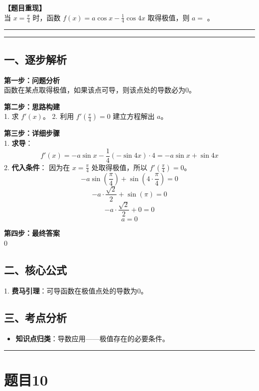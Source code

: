 \documentclass[12pt, a4paper]{ctexart}
\newcommand{\TopSeparator}{
    \par\noindent\rule{\textwidth}{1.5pt}\vspace{0.5em} %
}
\newcommand{\AnalysisSeparator}{
    \par\noindent\rule{\textwidth}{0.5pt}\vspace{0.2em}\hrule\vspace{0.5em} %
}
\newenvironment{RedAnalysis}{
    \par
    \color{red} %
}{
    \par
    \color{black} %
}
\begin{document}
\textbf{【题目重现】} \\
当 $ x=\frac{\pi}{4} $ 时，函数 $ f(x)=a\cos x-\frac{1}{4}\cos 4x $ 取得极值，则 $a=$ \underline{\hspace{2cm}}。

\AnalysisSeparator

\begin{RedAnalysis}

\subsection*{一、逐步解析}

\textbf{第一步：问题分析} \\
函数在某点取得极值，如果该点可导，则该点处的导数必为0。

\textbf{第二步：思路构建} \\
1. 求 $f'(x)$。
2. 利用 $f'(\frac{\pi}{4}) = 0$ 建立方程解出 $a$。

\textbf{第三步：详细步骤} \\
1. \textbf{求导}：
   \[ f'(x) = -a\sin x - \frac{1}{4}(-\sin 4x) \cdot 4 = -a\sin x + \sin 4x \]
2. \textbf{代入条件}：
   因为在 $x = \frac{\pi}{4}$ 处取得极值，所以 $f'(\frac{\pi}{4}) = 0$。
   \[ -a\sin(\frac{\pi}{4}) + \sin(4 \cdot \frac{\pi}{4}) = 0 \]
   \[ -a \cdot \frac{\sqrt{2}}{2} + \sin(\pi) = 0 \]
   \[ -a \cdot \frac{\sqrt{2}}{2} + 0 = 0 \]
   \[ a = 0 \]

\textbf{第四步：最终答案} \\
0

\subsection*{二、核心公式}
1. \textbf{费马引理}：可导函数在极值点处的导数为0。

\subsection*{三、考点分析}
\begin{itemize}
    \item \textbf{知识点归类}：导数应用——极值存在的必要条件。
\end{itemize}

\end{RedAnalysis}

\vspace{2em}

\TopSeparator
\section*{题目10}
\end{document}
